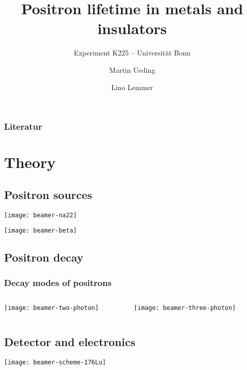 \documentclass[english, fleqn]{beamer}
\title{Positron lifetime in metals and insulators}
\subtitle{Experiment K225 -- Universität Bonn}
\author{%
    Martin Ueding
    \and
    Lino Lemmer
}
\date{\daterange{2016-03-24}{2016-03-25}}
\begin{document}
\begin{frame}
    \titlepage
\end{frame}

\begin{frame}
    \frametitle{Literatur}

    \printbibliography
\end{frame}

\section{Theory}

\subsection{Positron sources}

\begin{frame}
\texttt{[image: beamer-na22]}
\end{frame}

\begin{frame}
\texttt{[image: beamer-beta]}
\end{frame}

\subsection{Positron decay}

\begin{frame}
    \frametitle{Decay modes of positrons}

    \begin{columns}[c]
        \begin{column}{.5\textwidth}
            \centering
            \texttt{[image: beamer-two-photon]}
        \end{column}
        \begin{column}{.5\textwidth}
            \centering
            \texttt{[image: beamer-three-photon]}
        \end{column}
    \end{columns}
\end{frame}

\subsection{Detector and electronics}

\begin{frame}
    \texttt{[image: beamer-scheme-176Lu]}
\end{frame}
\end{document}
